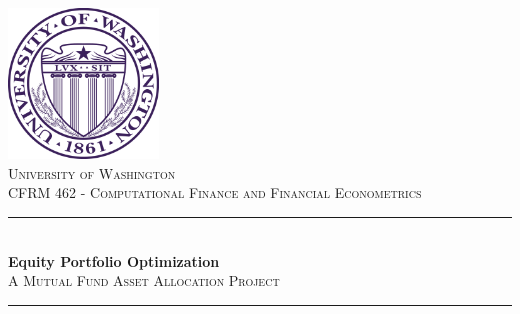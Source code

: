 \begin{titlepage}


\newcommand{\HRule}{\rule{\linewidth}{0.5mm}} %

\begin{center}



\includegraphics[height=4cm]{images/uw_seal}\\[1cm] %

\textsc{\LARGE University of Washington}
\\[0.5cm]
\textsc{\large CFRM 462 - Computational Finance and Financial Econometrics}\\[3cm]




\HRule \\[0.9cm]
{\huge \bfseries Equity Portfolio Optimization}\\[0.4cm] %
\textsc{\Large A Mutual Fund Asset Allocation Project}\\[0.5cm] %
\HRule \\[1.5cm]



\end{center}
\end{titlepage}
